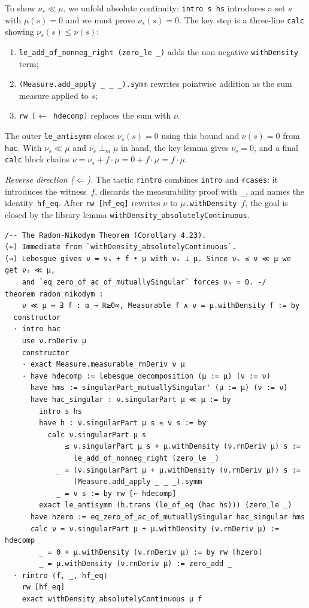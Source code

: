 \documentclass[11pt]{article}
\begin{document}
To show $\nu_s \ll \mu$, we unfold absolute continuity: \texttt{intro~s~hs} introduces a set $s$ with $\mu(s) = 0$ and we must prove $\nu_s(s) = 0$. The key step is a three-line \texttt{calc} showing $\nu_s(s) \le \nu(s)$:
\begin{enumerate}
\item \texttt{le\_add\_of\_nonneg\_right (zero\_le \_)} adds the non-negative \texttt{withDensity} term;
\item \texttt{(Measure.add\_apply \_ \_ \_).symm} rewrites pointwise addition as the sum measure applied to $s$;
\item \texttt{rw [$\leftarrow$ hdecomp]} replaces the sum with $\nu$.
\end{enumerate}
The outer \texttt{le\_antisymm} closes $\nu_s(s) = 0$ using this bound and $\nu(s) = 0$ from \texttt{hac}. With $\nu_s \ll \mu$ and $\nu_s \perp_m \mu$ in hand, the key lemma gives $\nu_s = 0$, and a final \texttt{calc} block chains $\nu = \nu_s + f \cdot \mu = 0 + f \cdot \mu = f \cdot \mu$.

\emph{Reverse direction ($\Leftarrow$).} The tactic \texttt{rintro} combines \texttt{intro} and \texttt{rcases}: it introduces the witness~$f$, discards the measurability proof with~\texttt{\_}, and names the identity~\texttt{hf\_eq}. After \texttt{rw~[hf\_eq]} rewrites $\nu$ to $\mu$\texttt{.withDensity}~$f$, the goal is closed by the library lemma \texttt{withDensity\_absolutelyContinuous}.

\begin{verbatim}
/-- The Radon-Nikodym Theorem (Corollary 4.23).
(⇐) Immediate from `withDensity_absolutelyContinuous`.
(⇒) Lebesgue gives ν = νₛ + f • μ with νₛ ⟂ μ. Since νₛ ≤ ν ≪ μ we get νₛ ≪ μ,
    and `eq_zero_of_ac_of_mutuallySingular` forces νₛ = 0. -/
theorem radon_nikodym :
    ν ≪ μ ↔ ∃ f : α → ℝ≥0∞, Measurable f ∧ ν = μ.withDensity f := by
  constructor
  · intro hac
    use ν.rnDeriv μ
    constructor
    · exact Measure.measurable_rnDeriv ν μ
    · have hdecomp := lebesgue_decomposition (μ := μ) (ν := ν)
      have hms := singularPart_mutuallySingular' (μ := μ) (ν := ν)
      have hac_singular : ν.singularPart μ ≪ μ := by
        intro s hs
        have h : ν.singularPart μ s ≤ ν s := by
          calc ν.singularPart μ s
              ≤ ν.singularPart μ s + μ.withDensity (ν.rnDeriv μ) s :=
                le_add_of_nonneg_right (zero_le _)
            _ = (ν.singularPart μ + μ.withDensity (ν.rnDeriv μ)) s :=
                (Measure.add_apply _ _ _).symm
            _ = ν s := by rw [← hdecomp]
        exact le_antisymm (h.trans (le_of_eq (hac hs))) (zero_le _)
      have hzero := eq_zero_of_ac_of_mutuallySingular hac_singular hms
      calc ν = ν.singularPart μ + μ.withDensity (ν.rnDeriv μ) := hdecomp
        _ = 0 + μ.withDensity (ν.rnDeriv μ) := by rw [hzero]
        _ = μ.withDensity (ν.rnDeriv μ) := zero_add _
  · rintro ⟨f, _, hf_eq⟩
    rw [hf_eq]
    exact withDensity_absolutelyContinuous μ f
\end{verbatim}
\end{document}
